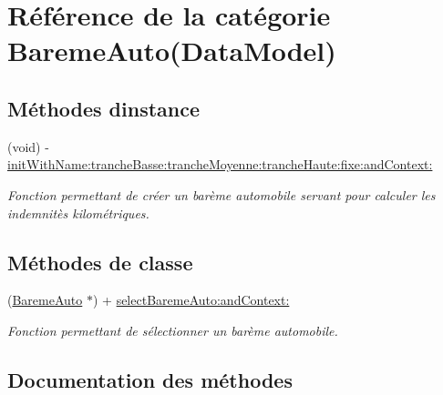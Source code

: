 \hypertarget{category_bareme_auto_07_data_model_08}{}\section{Référence de la catégorie Bareme\+Auto(Data\+Model)}
\label{category_bareme_auto_07_data_model_08}
\subsection*{Méthodes d\textquotesingle{}instance}
\begin{DoxyCompactItemize}
\item 
(void) -\/ \hyperlink{category_bareme_auto_07_data_model_08_a34905aa0136303afc3abde9c3978fc11}{init\+With\+Name\+:tranche\+Basse\+:tranche\+Moyenne\+:tranche\+Haute\+:fixe\+:and\+Context\+:}
\begin{DoxyCompactList}\small\item\em Fonction permettant de créer un barème automobile servant pour calculer les indemnitès kilométriques. \end{DoxyCompactList}\end{DoxyCompactItemize}
\subsection*{Méthodes de classe}
\begin{DoxyCompactItemize}
\item 
(\hyperlink{interface_bareme_auto}{Bareme\+Auto} $\ast$) + \hyperlink{category_bareme_auto_07_data_model_08_ae513644bd10af97e9f20f567d8b8d3de}{select\+Bareme\+Auto\+:and\+Context\+:}
\begin{DoxyCompactList}\small\item\em Fonction permettant de sélectionner un barème automobile. \end{DoxyCompactList}\end{DoxyCompactItemize}


\subsection{Documentation des méthodes}
\hypertarget{category_bareme_auto_07_data_model_08_a34905aa0136303afc3abde9c3978fc11}{}
